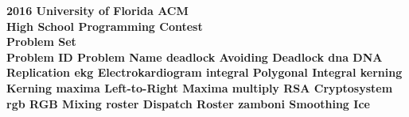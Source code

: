 \documentclass[a4paper,11pt]{article}
\begin{document}
\begin{center}
\vspace{+5mm}
\bf
{\Huge 2016 University of Florida ACM}\vspace{2 mm} \\	
{\huge High School Programming Contest}\vspace{2mm}\\
{\huge Problem Set}\vspace{2 mm} \\
\bf{
\vspace{15mm}
\huge{
Problem ID \hspace{+65mm} Problem Name
\newline
\newline
\newline
}
\LARGE{
deadlock \dotfill Avoiding Deadlock
\newline
\newline
\newline
dna \dotfill DNA Replication
\newline
\newline
\newline
ekg \dotfill Electrokardiogram
\newline
\newline
\newline
integral \dotfill Polygonal Integral
\newline
\newline
\newline
kerning \dotfill Kerning
\newline
\newline
\newline
maxima \dotfill Left-to-Right Maxima
\newline
\newline
\newline
multiply \dotfill RSA Cryptosystem
\newline
\newline
\newline
rgb \dotfill RGB Mixing
\newline
\newline
\newline
roster \dotfill Dispatch Roster
\newline
\newline
\newline
zamboni \dotfill Smoothing Ice
}
}
\end{center}
\end{document}
